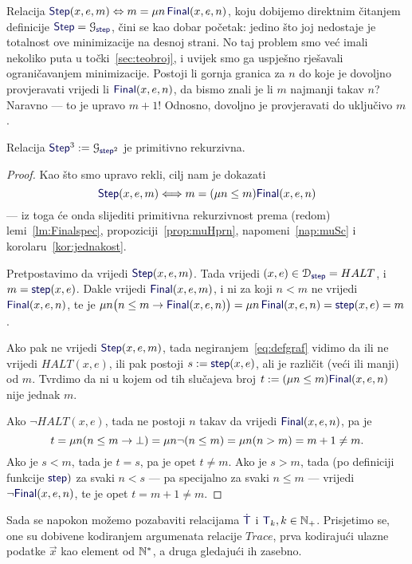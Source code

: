 Relacija $\f{Step}(x,e,m)\Leftrightarrow m= \mu n\,\f{Final}(x,e,n)$, koju dobijemo direktnim čitanjem definicije $\f{Step}=\graf{\f{step}}$, čini se kao dobar početak: jedino što joj nedostaje je totalnost ove minimizacije na desnoj strani. No taj problem smo već imali nekoliko puta u točki~\ref{sec:teobroj}, i uvijek smo ga uspješno rješavali ograničavanjem minimizacije. Postoji li gornja granica za $n$ do koje je dovoljno provjeravati vrijedi li $\f{Final}(x,e,n)$, da bismo znali je li $m$ najmanji takav $n$? Naravno --- to je upravo $m+1$! Odnosno, dovoljno je provjeravati do uključivo $m$.

\begin{lema}
Relacija $\f{Step}^3:=\graf{\f{step}^2}$ je primitivno rekurzivna.
\end{lema}

\begin{proof}
Kao što smo upravo rekli, cilj nam je dokazati
\begin{equation}
    \f{Step}(x,e,m)\Longleftrightarrow m=(\mu n\le m)\f{Final}(x,e,n)
\end{equation}
--- iz toga će onda slijediti primitivna rekurzivnost prema (redom) lemi~\ref{lm:Finalspec}, propoziciji~\ref{prop:muHprn}, napomeni~\ref{nap:muSc} i korolaru~\ref{kor:jednakost}.

Pretpostavimo da vrijedi $\f{Step}(x,e,m)$. Tada vrijedi $(x,e)\in\dom{\f{step}}=HALT$, i $m=\f{step}(x,e)$. Dakle vrijedi $\f{Final}(x,e,m)$, i ni za koji $n<m$ ne vrijedi $\f{Final}(x,e,n)$, te je $\mu n\bigl(n\le m\to\f{Final}(x,e,n)\bigr)=\mu n\,\f{Final}(x,e,n)=\f{step}(x,e)=m$.

Ako pak ne vrijedi $\f{Step}(x,e,m)$, tada negiranjem~\eqref{eq:defgraf} vidimo da ili ne vrijedi $HALT(x,e)$, ili pak postoji $s:=\f{step}(x,e)$, ali je različit (veći ili manji) od $m$. Tvrdimo da ni u kojem od tih slučajeva broj $t:=(\mu n\le m)\f{Final}(x,e,n)$ nije jednak $m$.

Ako $\lnot HALT(x,e)$, tada ne postoji $n$ takav da vrijedi $\f{Final}(x,e,n)$, pa je
\begin{equation}
    t = \mu n(n\le m\to\bot)=\mu n\lnot(n\le m)=\mu n(n>m)= m+1\not=m\text.
\end{equation}
Ako je $s<m$, tada je $t=s$, pa je opet $t\not=m$. Ako je $s>m$, tada (po definiciji funkcije $\f{step})$ za svaki $n<s$ --- pa specijalno za svaki $n\le m$ --- vrijedi $\lnot\f{Final}(x,e,n)$, te je opet $t=m+1\not=m$.
\end{proof}

Sada se napokon možemo pozabaviti relacijama $\f{\dot T}$ i $\f T_k,k\in\N_+$. Prisjetimo se, one su dobivene kodiranjem argumenata relacije $Trace$, prva kodirajući ulazne podatke $\vec x$ kao element od ${\mathbb N}^*$, a druga gledajući ih zasebno. 

